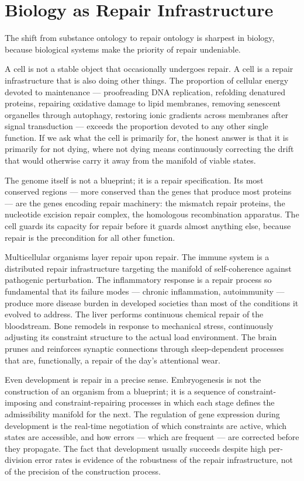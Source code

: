 \documentclass[11pt, a4paper]{article}
\theoremstyle{definition}
\theoremstyle{remark}
\begin{document}
\section{Biology as Repair Infrastructure}

The shift from substance ontology to repair ontology is sharpest in biology,
because biological systems make the priority of repair undeniable.

A cell is not a stable object that occasionally undergoes repair. A cell is a
repair infrastructure that is also doing other things. The proportion of
cellular energy devoted to maintenance --- proofreading DNA replication,
refolding denatured proteins, repairing oxidative damage to lipid membranes,
removing senescent organelles through autophagy, restoring ionic gradients
across membranes after signal transduction --- exceeds the proportion devoted to
any other single function. If we ask what the cell is primarily for, the honest
answer is that it is primarily for not dying, where not dying means continuously
correcting the drift that would otherwise carry it away from the manifold of
viable states.

The genome itself is not a blueprint; it is a repair specification. Its most
conserved regions --- more conserved than the genes that produce most proteins
--- are the genes encoding repair machinery: the mismatch repair proteins, the
nucleotide excision repair complex, the homologous recombination apparatus. The
cell guards its capacity for repair before it guards almost anything else, because
repair is the precondition for all other function.

Multicellular organisms layer repair upon repair. The immune system is a
distributed repair infrastructure targeting the manifold of self-coherence
against pathogenic perturbation. The inflammatory response is a repair process
so fundamental that its failure modes --- chronic inflammation, autoimmunity ---
produce more disease burden in developed societies than most of the conditions
it evolved to address. The liver performs continuous chemical repair of the
bloodstream. Bone remodels in response to mechanical stress, continuously
adjusting its constraint structure to the actual load environment. The brain
prunes and reinforces synaptic connections through sleep-dependent processes
that are, functionally, a repair of the day's attentional wear.

Even development is repair in a precise sense. Embryogenesis is not the
construction of an organism from a blueprint; it is a sequence of
constraint-imposing and constraint-repairing processes in which each stage
defines the admissibility manifold for the next. The regulation of gene
expression during development is the real-time negotiation of which constraints
are active, which states are accessible, and how errors --- which are frequent
--- are corrected before they propagate. The fact that development usually
succeeds despite high per-division error rates is evidence of the robustness of
the repair infrastructure, not of the precision of the construction process.
\end{document}
